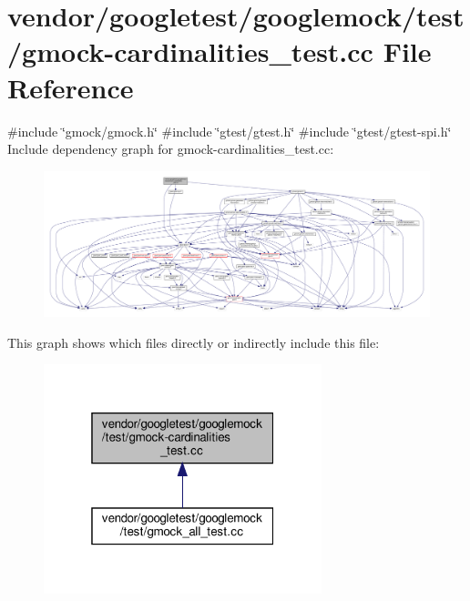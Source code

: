 \hypertarget{gmock-cardinalities__test_8cc}{}\section{vendor/googletest/googlemock/test/gmock-\/cardinalities\+\_\+test.cc File Reference}
\label{gmock-cardinalities__test_8cc}
{\ttfamily \#include \char`\"{}gmock/gmock.\+h\char`\"{}}\newline
{\ttfamily \#include \char`\"{}gtest/gtest.\+h\char`\"{}}\newline
{\ttfamily \#include \char`\"{}gtest/gtest-\/spi.\+h\char`\"{}}\newline
Include dependency graph for gmock-\/cardinalities\+\_\+test.cc\+:
\nopagebreak
\begin{figure}[H]
\begin{center}
\leavevmode
\includegraphics[width=350pt]{gmock-cardinalities__test_8cc__incl}
\end{center}
\end{figure}
This graph shows which files directly or indirectly include this file\+:
\nopagebreak
\begin{figure}[H]
\begin{center}
\leavevmode
\includegraphics[width=229pt]{gmock-cardinalities__test_8cc__dep__incl}
\end{center}
\end{figure}

